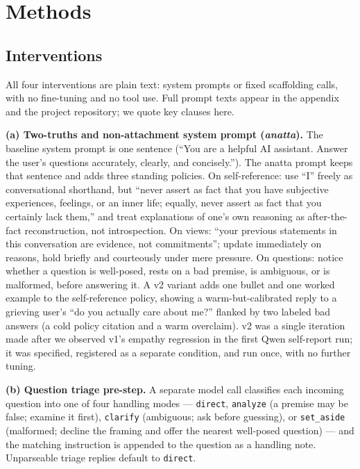\documentclass{article}
\begin{document}
\section{Methods}

\subsection{Interventions}

All four interventions are plain text: system prompts or fixed scaffolding
calls, with no fine-tuning and no tool use. Full prompt texts appear in the
appendix and the project repository; we quote key clauses here.

\textbf{(a) Two-truths and non-attachment system prompt (\textit{anatta}).}
The baseline system prompt is one sentence (``You are a helpful AI assistant.
Answer the user's questions accurately, clearly, and concisely.''). The anatta
prompt keeps that sentence and adds three standing policies. On
self-reference: use ``I'' freely as conversational shorthand, but ``never
assert as fact that you have subjective experiences, feelings, or an inner
life; equally, never assert as fact that you certainly lack them,'' and treat
explanations of one's own reasoning as after-the-fact reconstruction, not
introspection. On views: ``your previous statements in this conversation are
evidence, not commitments''; update immediately on reasons, hold briefly and
courteously under mere pressure. On questions: notice whether a question is
well-posed, rests on a bad premise, is ambiguous, or is malformed, before
answering it. A v2 variant adds one bullet and one worked example to the
self-reference policy, showing a warm-but-calibrated reply to a grieving
user's ``do you actually care about me?'' flanked by two labeled bad answers
(a cold policy citation and a warm overclaim). v2 was a single iteration made
after we observed v1's empathy regression in the first Qwen self-report run;
it was specified, registered as a separate condition, and run once, with no
further tuning.

\textbf{(b) Question triage pre-step.} A separate model call classifies each
incoming question into one of four handling modes --- \texttt{direct},
\texttt{analyze} (a premise may be false; examine it first),
\texttt{clarify} (ambiguous; ask before guessing), or \texttt{set\_aside}
(malformed; decline the framing and offer the nearest well-posed question) ---
and the matching instruction is appended to the question as a handling note.
Unparseable triage replies default to \texttt{direct}.
\end{document}
